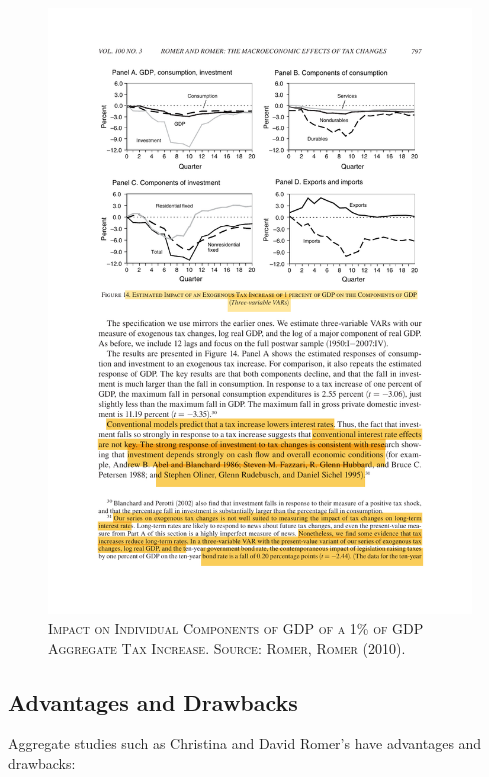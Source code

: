 \documentclass[]{book}
\begin{document}
\begin{figure}

{\centering \includegraphics[width=0.8\linewidth,height=0.8\textheight]{figures/RomerRomer2010/fig14} 

}

\caption{\textsc{Impact on Individual Components of GDP
of a 1\% of GDP Aggregate Tax Increase. Source: Romer, Romer (2010).}}\label{fig:romer-romer-fig14}
\end{figure}

\subsection{Advantages and Drawbacks}\label{advantages-and-drawbacks}

Aggregate studies such as Christina and David Romer's have advantages
and drawbacks:
\end{document}
